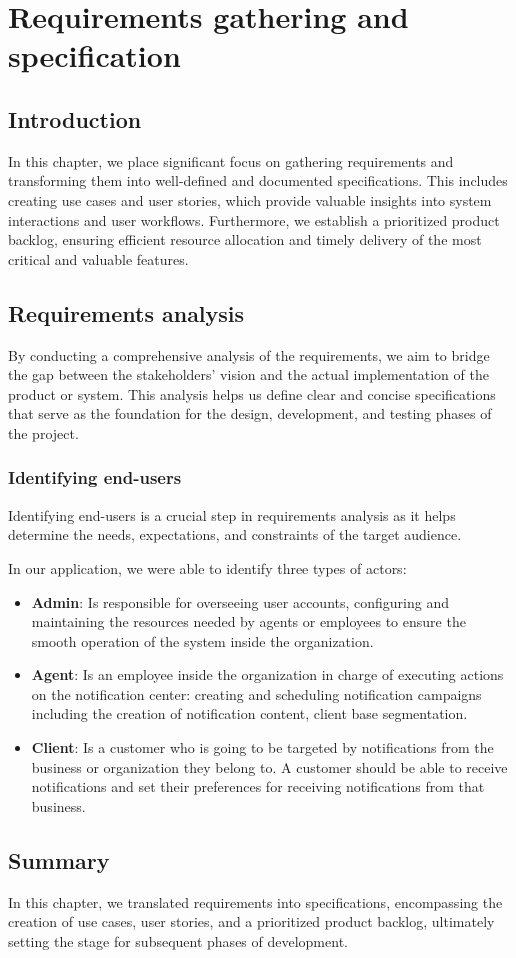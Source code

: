 \chapter{Requirements gathering and specification}

\section*{Introduction}
In this chapter, we place significant focus on gathering requirements and transforming them 
into well-defined and documented specifications. This includes creating use cases and user stories, 
which provide valuable insights into system interactions and user workflows. Furthermore, we establish 
a prioritized product backlog, ensuring efficient resource allocation and timely delivery of the most 
critical and valuable features. 

\section{Requirements analysis}
By conducting a comprehensive analysis of the requirements, we aim to bridge the gap between 
the stakeholders' vision and the actual implementation of the product or system. 
This analysis helps us define clear and concise specifications that serve as the foundation for the design, 
development, and testing phases of the project.

\subsection{Identifying end-users}
Identifying end-users is a crucial step in requirements analysis as it helps determine the needs, 
expectations, and constraints of the target audience.

In our application, we were able to identify three types of actors:

\begin{itemize}
    \item \textbf{Admin}: Is responsible for overseeing user accounts, configuring and maintaining the 
    resources needed by agents or employees to ensure the smooth operation of the system inside the organization.
    
    \item \textbf{Agent}: Is an employee inside the organization in charge of executing actions on the 
    notification center: creating and scheduling notification campaigns including the creation of
    notification content, client base segmentation. 

    \item \textbf{Client}: Is a customer who is going to be targeted by notifications from the business 
    or organization they belong to. A customer should be able to receive notifications and set their 
    preferences for receiving notifications from that business. 
\end{itemize}

\section*{Summary}
In this chapter, we translated requirements into specifications, encompassing the creation of use cases,
user stories, and a prioritized product backlog, ultimately setting the stage for subsequent phases 
of development.